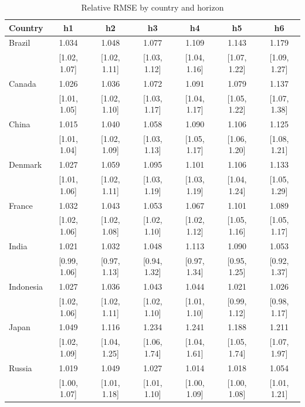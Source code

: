 \begin{table}[htbp]
\centering
\caption{Relative RMSE by country and horizon}
\label{tab:relrmse_country_horizon}
{\fontsize{8}{10}\selectfont\setlength{\tabcolsep}{3pt}
\begin{tabular*}{\textwidth}{@{\extracolsep{\fill}}lcccccc}
\toprule
Country & h1 & h2 & h3 & h4 & h5 & h6 \\
\midrule
Brazil & 1.034 & 1.048 & 1.077 & 1.109 & 1.143 & 1.179 \\
 & [1.02, 1.07] & [1.02, 1.11] & [1.03, 1.12] & [1.04, 1.16] & [1.07, 1.22] & [1.09, 1.27] \\
\addlinespace
Canada & 1.026 & 1.036 & 1.072 & 1.091 & 1.079 & 1.137 \\
 & [1.01, 1.05] & [1.02, 1.10] & [1.03, 1.17] & [1.04, 1.17] & [1.05, 1.22] & [1.07, 1.38] \\
\addlinespace
China & 1.015 & 1.040 & 1.058 & 1.090 & 1.106 & 1.125 \\
 & [1.01, 1.04] & [1.02, 1.09] & [1.03, 1.13] & [1.05, 1.17] & [1.06, 1.20] & [1.08, 1.21] \\
\addlinespace
Denmark & 1.027 & 1.059 & 1.095 & 1.101 & 1.106 & 1.133 \\
 & [1.01, 1.06] & [1.02, 1.11] & [1.03, 1.19] & [1.03, 1.19] & [1.04, 1.24] & [1.05, 1.29] \\
\addlinespace
France & 1.032 & 1.043 & 1.053 & 1.067 & 1.101 & 1.089 \\
 & [1.02, 1.06] & [1.02, 1.08] & [1.02, 1.10] & [1.02, 1.12] & [1.05, 1.16] & [1.05, 1.17] \\
\addlinespace
India & 1.021 & 1.032 & 1.048 & 1.113 & 1.090 & 1.053 \\
 & [0.99, 1.06] & [0.97, 1.13] & [0.94, 1.32] & [0.97, 1.34] & [0.95, 1.25] & [0.92, 1.37] \\
\addlinespace
Indonesia & 1.027 & 1.036 & 1.043 & 1.044 & 1.021 & 1.026 \\
 & [1.02, 1.06] & [1.02, 1.11] & [1.02, 1.10] & [1.01, 1.10] & [0.99, 1.12] & [0.98, 1.17] \\
\addlinespace
Japan & 1.049 & 1.116 & 1.234 & 1.241 & 1.188 & 1.211 \\
 & [1.02, 1.09] & [1.04, 1.25] & [1.06, 1.74] & [1.04, 1.61] & [1.05, 1.74] & [1.07, 1.97] \\
\addlinespace
Russia & 1.019 & 1.049 & 1.027 & 1.014 & 1.018 & 1.054 \\
 & [1.00, 1.07] & [1.01, 1.18] & [1.01, 1.10] & [1.00, 1.09] & [1.00, 1.08] & [1.01, 1.21] \\

\end{tabular*}}
\end{table}
